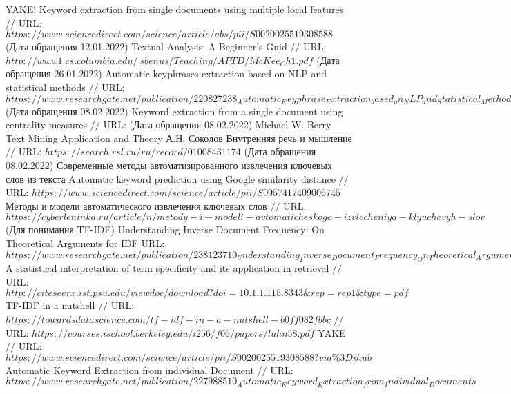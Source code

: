 \makeatletter \renewcommand{} \makeatother
\renewcommand\bibname{СПИСОК ИСПОЛЬЗОВАННЫХ ИСТОЧНИКОВ}
\begingroup
\renewcommand{\section}[2]{}
\begin{thebibliography}{}
YAKE! Keyword extraction from single documents using multiple local features $//$ URL: $https://www.sciencedirect.com/science/article/abs/pii/S0020025519308588$ (Дата обращения 12.01.2022)
Textual Analysis: A Beginner's Guid  $//$ URL: $http://www1.cs.columbia.edu/~sbenus/Teaching/APTD/McKee_Ch1.pdf$ (Дата обращения 26.01.2022)
Automatic keyphrases extraction based on NLP  and statistical methods $//$ URL: $https://www.researchgate.net/publication/220827238_Automatic_Keyphrase_Extraction_based_on_NLP_and_Statistical_Methods$ (Дата обращения 08.02.2022)
Keyword extraction from a single document using centrality measures $//$ URL:  (Дата обращения 08.02.2022)
Michael W. Berry Text Mining Application and Theory
А.Н. Соколов Внутренняя речь и мышление $//$ URL: $https://search.rsl.ru/ru/record/01008431174$ (Дата обращения 08.02.2022)
Современные методы автоматизированного извлечения ключевых слов из текста
Automatic keyword prediction using Google similarity distance $//$ URL: $https://www.sciencedirect.com/science/article/pii/S0957417409006745$
Методы и модели автоматического извлечения ключевых слов $//$ URL: $https://cyberleninka.ru/article/n/metody-i-modeli-avtomaticheskogo-izvlecheniya-klyuchevyh-slov$
(Для понимания TF-IDF) Understanding Inverse Document Frequency: On Theoretical Arguments for IDF URL: $https://www.researchgate.net/publication/238123710_Understanding_Inverse_Document_Frequency_On_Theoretical_Arguments_for_IDF$
A statistical interpretation of term specificity and its application in retrieval $//$ URL: $http://citeseerx.ist.psu.edu/viewdoc/download?doi=10.1.1.115.8343\&rep=rep1\&type=pdf$
TF-IDF in a nutshell $//$ URL: $https://towardsdatascience.com/tf-idf-in-a-nutshell-b0ff082fbbc$
$//$ URL: $https://courses.ischool.berkeley.edu/i256/f06/papers/luhn58.pdf$
YAKE $//$ URL: $https://www.sciencedirect.com/science/article/pii/S0020025519308588?via\%3Dihub$
Automatic Keyword Extraction from individual Document
$//$ URL: $https://www.researchgate.net/publication/227988510_Automatic_Keyword_Extraction_from_Individual_Documents$

\end{thebibliography}
